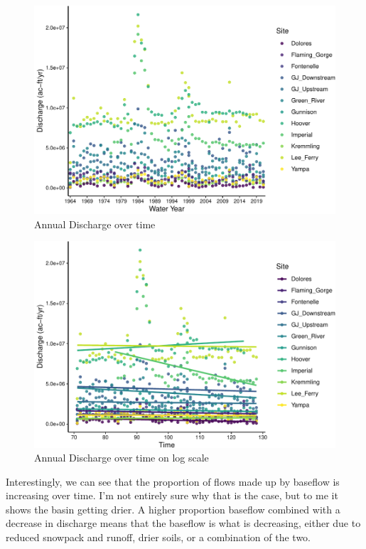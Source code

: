 \documentclass[
  12pt,
]{article}
\begin{document}
\begin{figure}

\includegraphics{WDA_final_project_files/figure-latex/Discharge Over Time-1} \hfill{}

\caption{Annual Discharge over time}\label{fig:Discharge Over Time}
\end{figure}

\begin{figure}

\includegraphics{WDA_final_project_files/figure-latex/Annual Discharge Trends-1} \hfill{}

\caption{Annual Discharge over time on log scale}\label{fig:Annual Discharge Trends}
\end{figure}

Interestingly, we can see that the proportion of flows made up by
baseflow is increasing over time. I'm not entirely sure why that is the
case, but to me it shows the basin getting drier. A higher proportion
baseflow combined with a decrease in discharge means that the baseflow
is what is decreasing, either due to reduced snowpack and runoff, drier
soils, or a combination of the two.
\end{document}
